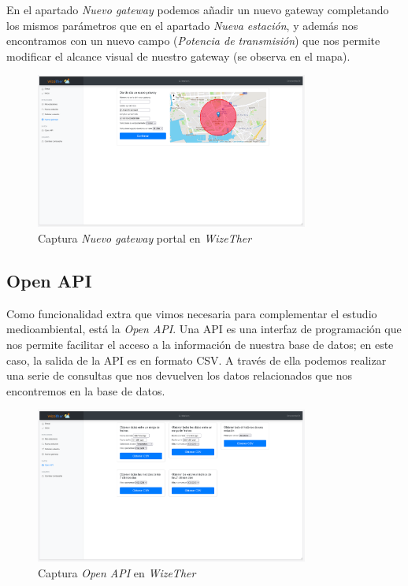 \documentclass[12pt]{article}
\begin{document}
\noindent En el apartado \textit{Nuevo gateway} podemos añadir un nuevo gateway completando los mismos parámetros que en el apartado \textit{Nueva estación}, y además nos encontramos con un nuevo campo (\textit{Potencia de transmisión}) que nos permite modificar el alcance visual de nuestro gateway  (se observa en el mapa).

\begin{figure}[h]
	\begin{center}
		\includegraphics[width=0.8\textwidth]{img_rani/nuevo_gateway.png}
		\caption{Captura \textit{Nuevo gateway} portal en \textit{WizeTher}}
	\end{center}
\end{figure}

\pagebreak

\subsection{Open API}
Como funcionalidad extra que vimos necesaria para complementar el estudio medioambiental, está la \textit{Open API}. Una API es una interfaz de programación que nos permite facilitar el acceso a la información de nuestra base de datos; en este caso, la salida de la API es en formato CSV. A través de ella podemos realizar una serie de consultas que nos devuelven los datos relacionados que nos encontremos en la base de datos.

\begin{figure}[h]
	\begin{center}
		\includegraphics[width=0.8\textwidth]{img_rani/open_api.png}
		\caption{Captura \textit{Open API}  en \textit{WizeTher}}
	\end{center}
\end{figure}
\end{document}
